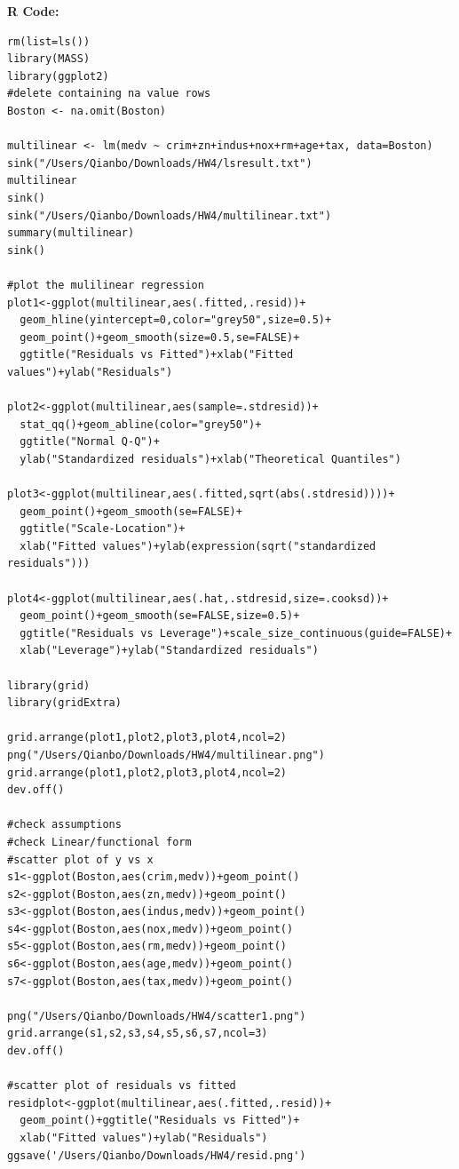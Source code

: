 \documentclass[10pt,letterpaper]{article}
\begin{document}
\newpage
\textbf{R Code: }
\begin{lstlisting}
rm(list=ls())
library(MASS)
library(ggplot2)
#delete containing na value rows
Boston <- na.omit(Boston)

multilinear <- lm(medv ~ crim+zn+indus+nox+rm+age+tax, data=Boston)
sink("/Users/Qianbo/Downloads/HW4/lsresult.txt")
multilinear
sink()
sink("/Users/Qianbo/Downloads/HW4/multilinear.txt")
summary(multilinear)
sink()

#plot the mulilinear regression 
plot1<-ggplot(multilinear,aes(.fitted,.resid))+
  geom_hline(yintercept=0,color="grey50",size=0.5)+
  geom_point()+geom_smooth(size=0.5,se=FALSE)+
  ggtitle("Residuals vs Fitted")+xlab("Fitted values")+ylab("Residuals")

plot2<-ggplot(multilinear,aes(sample=.stdresid))+
  stat_qq()+geom_abline(color="grey50")+
  ggtitle("Normal Q-Q")+
  ylab("Standardized residuals")+xlab("Theoretical Quantiles")

plot3<-ggplot(multilinear,aes(.fitted,sqrt(abs(.stdresid))))+
  geom_point()+geom_smooth(se=FALSE)+
  ggtitle("Scale-Location")+
  xlab("Fitted values")+ylab(expression(sqrt("standardized residuals")))

plot4<-ggplot(multilinear,aes(.hat,.stdresid,size=.cooksd))+
  geom_point()+geom_smooth(se=FALSE,size=0.5)+
  ggtitle("Residuals vs Leverage")+scale_size_continuous(guide=FALSE)+
  xlab("Leverage")+ylab("Standardized residuals")

library(grid)
library(gridExtra)

grid.arrange(plot1,plot2,plot3,plot4,ncol=2)
png("/Users/Qianbo/Downloads/HW4/multilinear.png")
grid.arrange(plot1,plot2,plot3,plot4,ncol=2)
dev.off()

#check assumptions
#check Linear/functional form
#scatter plot of y vs x
s1<-ggplot(Boston,aes(crim,medv))+geom_point()
s2<-ggplot(Boston,aes(zn,medv))+geom_point()
s3<-ggplot(Boston,aes(indus,medv))+geom_point()
s4<-ggplot(Boston,aes(nox,medv))+geom_point()
s5<-ggplot(Boston,aes(rm,medv))+geom_point()
s6<-ggplot(Boston,aes(age,medv))+geom_point()
s7<-ggplot(Boston,aes(tax,medv))+geom_point()

png("/Users/Qianbo/Downloads/HW4/scatter1.png")
grid.arrange(s1,s2,s3,s4,s5,s6,s7,ncol=3)
dev.off()

#scatter plot of residuals vs fitted 
residplot<-ggplot(multilinear,aes(.fitted,.resid))+
  geom_point()+ggtitle("Residuals vs Fitted")+
  xlab("Fitted values")+ylab("Residuals")
ggsave('/Users/Qianbo/Downloads/HW4/resid.png')


\end{lstlisting}
\end{document}
